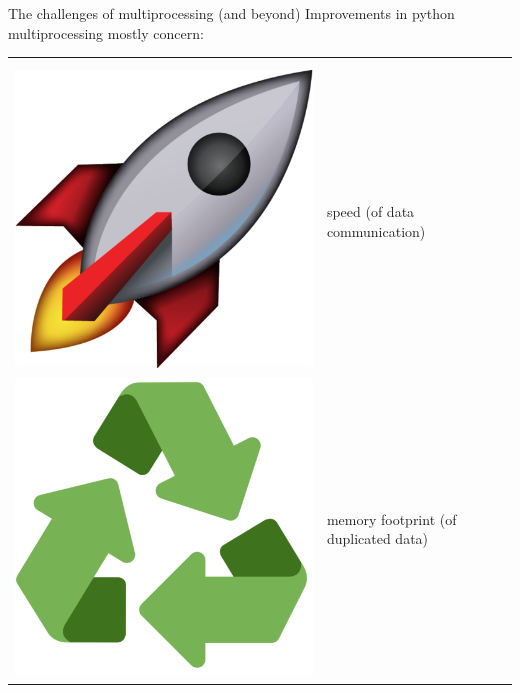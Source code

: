 \documentclass[13pt, usenames,dvipsnames]{beamer} %
\begin{document}
    \begin{frame}[t]{The challenges of multiprocessing (and beyond)}
        \vspace{1cm}
        Improvements in python multiprocessing mostly concern:
        \hspace{10em}
        \begin{tabular}{m{0.5cm} m{10cm}}
                 & \\
                 & \\
                \includegraphics[width=\linewidth] {media/rocket-emoji.png} & speed (of data communication) \\
                \includegraphics[width=\linewidth]{media/recyclable_emoji.png} & memory footprint (of duplicated data) \\

\end{tabular}
\end{frame}
\end{document}
